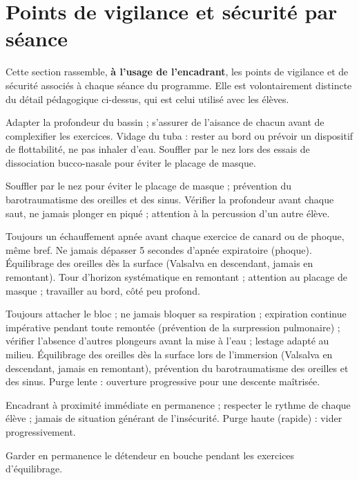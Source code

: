 
\section{Points de vigilance et sécurité par séance}
\label{sec:vigilance}

Cette section rassemble, \textbf{à l'usage de l'encadrant}, les points de vigilance et de
sécurité associés à chaque séance du programme. Elle est volontairement distincte du détail
pédagogique ci-dessus, qui est celui utilisé avec les élèves.

\begin{description}[leftmargin=0.7cm]
  \item[Séance 1] Adapter la profondeur du bassin ; s'assurer de l'aisance de chacun avant
    de complexifier les exercices. Vidage du tuba : rester au bord ou prévoir un
    dispositif de flottabilité, ne pas inhaler d'eau. Souffler par le nez lors des
    essais de dissociation bucco-nasale pour éviter le placage de masque.
  \item[Séance 2] Souffler par le nez pour éviter le placage de masque ; prévention du
    barotraumatisme des oreilles et des sinus. Vérifier la profondeur avant chaque saut,
    ne jamais plonger en piqué ; attention à la percussion d'un autre élève.
  \item[Séance 3] Toujours un échauffement apnée avant chaque exercice de canard ou de
    phoque, même bref. Ne jamais dépasser 5 secondes d'apnée expiratoire (phoque).
    Équilibrage des oreilles dès la surface (Valsalva en descendant, jamais en
    remontant). Tour d'horizon systématique en remontant ; attention au placage de
    masque ; travailler au bord, côté peu profond.
  \item[Séance 4] Toujours attacher le bloc ; ne jamais bloquer sa respiration ;
    expiration continue impérative pendant toute remontée (prévention de la surpression
    pulmonaire) ; vérifier l'absence d'autres plongeurs avant la mise à l'eau ; lestage
    adapté au milieu. Équilibrage des oreilles dès la surface lors de l'immersion
    (Valsalva en descendant, jamais en remontant), prévention du barotraumatisme des
    oreilles et des sinus. Purge lente : ouverture progressive pour une descente
    maîtrisée.
  \item[Séance 5] Encadrant à proximité immédiate en permanence ; respecter le rythme de
    chaque élève ; jamais de situation générant de l'insécurité. Purge haute (rapide) :
    vider progressivement.
  \item[Séance 6] Garder en permanence le détendeur en bouche pendant les exercices d'équilibrage.

\end{description}
